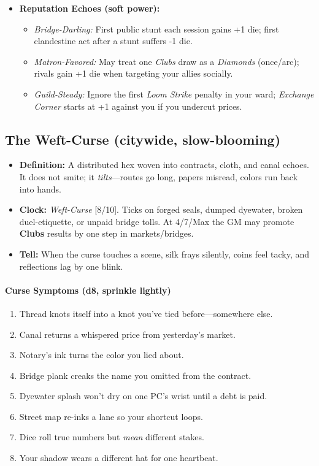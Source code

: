 \begin{itemize}
  \item \textbf{Reputation Echoes (soft power):}
  \begin{itemize}
    \item \emph{Bridge-Darling:} First public stunt each session gains +1 die; first clandestine act after a stunt suffers -1 die.
    \item \emph{Matron-Favored:} May treat one \emph{Clubs} draw as a \emph{Diamonds} (once/arc); rivals gain +1 die when targeting your allies socially.
    \item \emph{Guild-Steady:} Ignore the first \emph{Loom Strike} penalty in your ward; \emph{Exchange Corner} starts at +1 against you if you undercut prices.
  \end{itemize}
\end{itemize}


\subsection*{The Weft-Curse (citywide, slow-blooming)}
\begin{itemize}
  \item \textbf{Definition:} A distributed hex woven into contracts, cloth, and canal echoes. It does not smite; it \emph{tilts}—routes go long, papers misread, colors run back into hands.
  \item \textbf{Clock:} \emph{Weft-Curse} [8/10]. Ticks on forged seals, dumped dyewater, broken duel-etiquette, or unpaid bridge tolls. At 4/7/Max the GM may promote \textbf{Clubs} results by one step in markets/bridges.
  \item \textbf{Tell:} When the curse touches a scene, silk frays silently, coins feel tacky, and reflections lag by one blink.
\end{itemize}

\paragraph{Curse Symptoms (d8, sprinkle lightly)}
\begin{enumerate}
  \item Thread knots itself into a knot you’ve tied before—somewhere else.  
  \item Canal returns a whispered price from yesterday’s market.  
  \item Notary’s ink turns the color you lied about.  
  \item Bridge plank creaks the name you omitted from the contract.  
  \item Dyewater splash won’t dry on one PC’s wrist until a debt is paid.  
  \item Street map re-inks a lane so your shortcut loops.  
  \item Dice roll true numbers but \emph{mean} different stakes.  
  \item Your shadow wears a different hat for one heartbeat.  
\end{enumerate}

